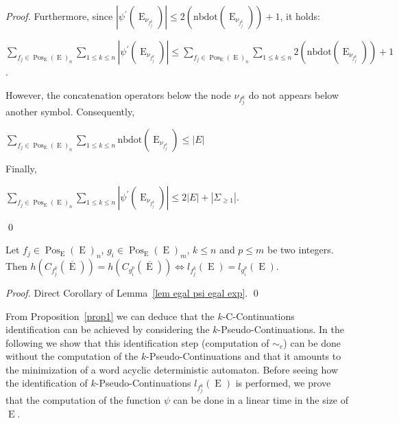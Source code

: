 \documentclass{llncs}
\def\Po#1#2{\Pos_{#1}{(#2)}}
\DeclareMathOperator{\E}{E}
\DeclareMathOperator{\Pos}{Pos}
\def\b#1{\overline{#1}}
\begin{document}
\begin{proof}
  
 Furthermore, since $|\psi^{\prime}(\E_{\nu_{f^k_j}})|\leq 2(\mathrm{nbdot}(\E_{\nu_{f^k_j}}))+1$, it holds:
 
 \centerline{$\sum_{f_j\in \Po{\E}{\E}_n}\sum_{1\leq k\leq n}|\psi^{\prime}(\E_{\nu_{f^k_j}})|\leq \sum_{f_j\in \Po{\E}{\E}_n}\sum_{1\leq k\leq n} 2(\mathrm{nbdot}(\E_{\nu_{f^k_j}}))+1$.}
 
 However, the concatenation operators below the node $\nu_{f^k_j}$ do not appears below another symbol. Consequently, 
 
 \centerline{$\sum_{f_j\in \Po{\E}{\E}_n}\sum_{1\leq k\leq n} \mathrm{nbdot}(\E_{\nu_{f^k_j}}) \leq |E|$}
 
 Finally,
 
 \centerline{$\sum_{f_j\in \Po{\E}{\E}_n}\sum_{1\leq k\leq n}|\psi^{\prime}(\E_{\nu_{f^k_j}})|\leq 2|E| + |\Sigma_{\geq 1}|$.}
 
  \qed
 \end{proof}



\begin{proposition}\label{prop1}
Let $f_j\in \Po{\E}{\E}_n$, $g_i\in \Po{\E}{\E}_m$, $k\leq n$ and $p\leq m$ be two integers. Then $h(C_{f^k_j}(\b\E))= h(C_{g^p_i}(\b\E))\Leftrightarrow l_{f^k_j}(\E)=l_{g^p_i}(\E)$.
\end{proposition}
\begin{proof}
  Direct Corollary of Lemma~\ref{lem egal psi egal exp}.
 \qed
\end{proof}

  From Proposition~\ref{prop1} we can deduce that the $k$-C-Continuations identification can be achieved by considering the $k$-Pseudo-Continuations. In the following we show that this identification step (computation of ${\sim_e}$) can be done without the computation of the $k$-Pseudo-Continuations and  that it amounts to the minimization of a word acyclic deterministic automaton. Before seeing how the identification of $k$-Pseudo-Continuations $l_{f^k_j}(\E)$ is performed, we prove that the computation of the function $\psi$ can be done in a linear time in the size of $\E$. 
\end{document}
